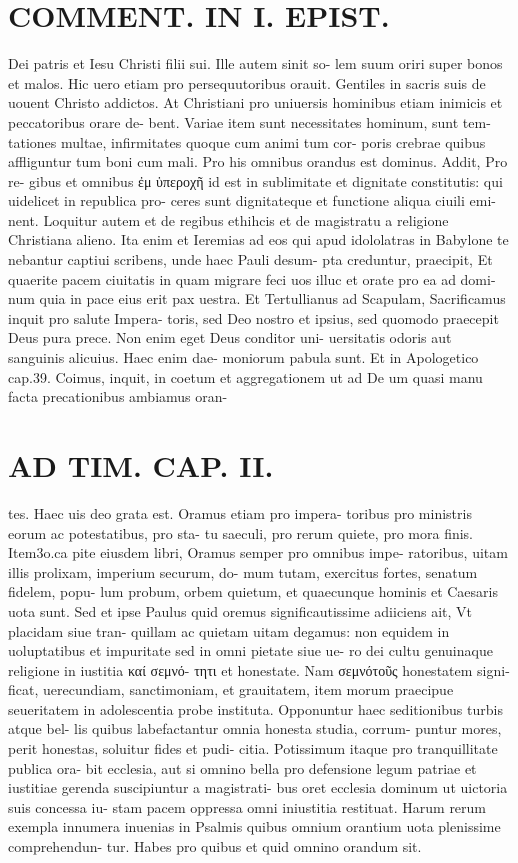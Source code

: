 \documentclass{article}
\begin{document}
\begin{pages}
\section*{COMMENT. IN I. EPIST. }\pstart Dei patris et Iesu Christi filii sui. Ille autem sinit so- lem suum oriri super bonos et malos. Hic uero etiam pro persequutoribus orauit. Gentiles in sacris suis de uouent Christo addictos. At Christiani pro uniuersis hominibus etiam inimicis et peccatoribus orare de- bent. Variae item sunt necessitates hominum, sunt tem- tationes multae, infirmitates quoque cum animi tum cor- poris crebrae quibus affliguntur tum boni cum mali. Pro his omnibus orandus est dominus. Addit, Pro re- gibus et omnibus ἐμ ὑπεροχῆ id est in sublimitate et dignitate constitutis: qui uidelicet in republica pro- ceres sunt dignitateque et functione aliqua ciuili emi- nent. Loquitur autem et de regibus ethihcis et de magistratu a religione Christiana alieno. Ita enim et Ieremias ad eos qui apud idololatras in Babylone te nebantur captiui scribens, unde haec Pauli desum- pta creduntur, praecipit, Et quaerite pacem ciuitatis in quam migrare feci uos illuc et orate pro ea ad domi- num quia in pace eius erit pax uestra. Et Tertullianus ad Scapulam, Sacrificamus inquit pro salute Impera- toris, sed Deo nostro et ipsius, sed quomodo praecepit Deus pura prece. Non enim eget Deus conditor uni- uersitatis odoris aut sanguinis alicuius. Haec enim dae- moniorum pabula sunt. Et in Apologetico cap.39. Coimus, inquit, in coetum et aggregationem ut ad De um quasi manu facta precationibus ambiamus oran-  \pend
\section*{AD TIM. CAP. II. }
\marginpar{[ p.113 ]}\pstart tes. Haec uis deo grata est. Oramus etiam pro impera- toribus pro ministris eorum ac potestatibus, pro sta- tu saeculi, pro rerum quiete, pro mora finis. Item3o.ca pite eiusdem libri, Oramus semper pro omnibus impe- ratoribus, uitam illis prolixam, imperium securum, do- mum tutam, exercitus fortes, senatum fidelem, popu- lum probum, orbem quietum, et quaecunque hominis et Caesaris uota sunt. Sed et ipse Paulus quid oremus significautissime adiiciens ait, Vt placidam siue tran- quillam ac quietam uitam degamus: non equidem in uoluptatibus et impuritate sed in omni pietate siue ue- ro dei cultu genuinaque religione in iustitia καί σεμνό- τητι et honestate. Nam σεμνότοῦς honestatem signi- ficat, uerecundiam, sanctimoniam, et grauitatem, item morum praecipue seueritatem in adolescentia probe instituta. Opponuntur haec seditionibus turbis atque bel- lis quibus labefactantur omnia honesta studia, corrum- puntur mores, perit honestas, soluitur fides et pudi- citia. Potissimum itaque pro tranquillitate publica ora- bit ecclesia, aut si omnino bella pro defensione legum patriae et iustitiae gerenda suscipiuntur a magistrati- bus oret ecclesia dominum ut uictoria suis concessa iu- stam pacem oppressa omni iniustitia restituat. Harum rerum exempla innumera inuenias in Psalmis quibus omnium orantium uota plenissime comprehendun- tur. Habes pro quibus et quid omnino orandum sit.  \pend

\end{pages}
\end{document}
